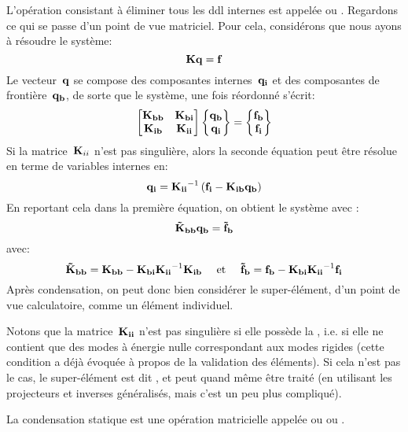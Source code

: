 L'opération consistant à éliminer tous les ddl internes est appelée
 ou .
\medskip
Regardons ce qui se passe d'un point de vue matriciel.
Pour cela, considérons que nous ayons à résoudre le système:
\begin{equation} \MM{K} \VV{q}=\VV{f}\end{equation}
Le vecteur~$\VV{q}$ se compose des composantes internes~$\VV{q_i}$ et des composantes
de frontière~$\VV{q_b}$, de sorte que le système, une fois réordonné s'écrit:
\begin{equation}
\MM*{\MM{K_{bb}} & \MM{K_{bi}}\\
\MM{K_{ib}} & \MM{K_{ii}}}
\VV*{\VV{q_b}\\\VV{q_i}}
=
\VV*{\VV{f_b}\\\VV{f_i}}
\end{equation}
Si la matrice~$\MM{K}_{ii}$ n'est pas singulière, alors la seconde équation peut être
résolue en terme de variables internes en:
\begin{equation}
\VV{q_i} = \MMI{K_{ii}}\left(\VV{f_i}-\MM{K_{ib}}\VV{q_b}\right)
\end{equation}
En reportant cela dans la première équation, on obtient le système avec :
\begin{equation}
\MM{\tilde{K}_{bb}}\VV{q_b} = \VV{\tilde{f}_b}
\end{equation}
avec:
\begin{equation}
\MM{\tilde{K}_{bb}}=\MM{K_{bb}} - \MM{K_{bi}}\MMI{K_{ii}}\MM{K_{ib}}
\quad \text{ et }\quad
\VV{\tilde{f}_b}=\VV{f_b} - \MM{K_{bi}}\MMI{K_{ii}}\VV{f_i}
\end{equation}
Après condensation, on peut donc bien considérer le super-élément, d'un point de vue calculatoire,
comme un élément individuel.

\medskip
Notons que la matrice~$\MM{K_{ii}}$ n'est pas singulière si elle possède la , i.e. si elle ne contient que des modes à énergie nulle correspondant aux
modes rigides (cette condition a déjà évoquée à propos de la validation des éléments).
Si cela n'est pas le cas, le super-élément est dit , et
peut quand même être traité (en utilisant les projecteurs et inverses généralisés,
mais c'est un peu plus compliqué).

La condensation statique est une opération matricielle
appelée  ou  ou
.

